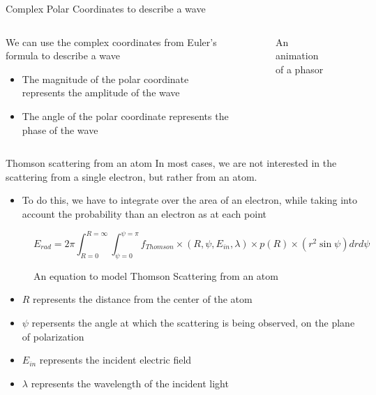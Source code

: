 \documentclass[aspectratio=169]{beamer}
\begin{document}
				
\begin{frame}{Complex Polar Coordinates to describe a wave}
	\begin{columns}[c]
		\begin{column}{.5\textwidth}
			We can use the complex coordinates from Euler's formula to describe a wave
			\begin{itemize}
				\item The magnitude of the polar coordinate represents the amplitude of the wave
				\item The angle of the polar coordinate represents the phase of the wave
				
			\end{itemize}
		\end{column}
										
		\begin{column}{.5\textwidth}
			\begin{figure}
				\label{fig:Phasor}	
				\caption{An animation of a phasor}
			\end{figure}
		\end{column}
	\end{columns}
									
\end{frame}
				
\begin{frame}[t]{Thomson scattering from an atom}
	In most cases, we are not interested in the scattering from a single electron, but rather from an atom.
	
	\begin{itemize}
		\item To do this, we have to integrate over the area of an electron, while taking into account the probability than an electron as at each point
	\end{itemize}
	
	\begin{figure}
		$$ E_{rad} = 2 \pi  \int_{R=0}^{R=\infty} \int_{\psi = 0}^{\psi = \pi} f_{Thomson} \times (R, \psi, E_{in}, \lambda) \times p(R) \times (r^2 \sin \psi) dr d\psi$$
		\caption{An equation to model Thomson Scattering from an atom}
	\end{figure}		
	
	\begin{scriptsize}
	\begin{itemize}
		\item $R$ represents the distance from the center of the atom
		\item $\psi$ repersents the angle at which the scattering is being observed, on the plane of polarization
		\item $E_{in}$ represents the incident electric field
		\item $\lambda$ represents the wavelength of the incident light
	\end{itemize}
	\end{scriptsize}
	
\end{frame}				
	
\end{document}
